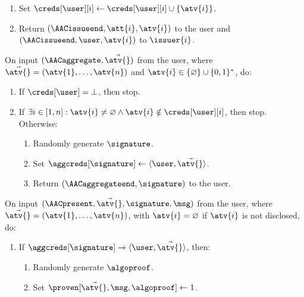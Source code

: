 \begin{framed}
\begin{enumerate}
\begin{enumerate}
	    \end{enumerate}

	  \item Set $\creds[\user][i] \leftarrow \creds[\user][i] \cup
\{\atv{i}\}$.

	  \item Return $(\AACissueend, \att{i}, \atv{i})$ to the user and
$(\AACissueend, \user, \atv{i})$ to $\issuer{i}$.

	\end{enumerate}

	\fuinterface{\AACaggregate} On input $(\AACaggregate, \vec{\atv{}})$ from the
user, where $\vec{\atv{}} = (\atv{1}, \ldots, \atv{n})$ and $\atv{i} \in
\{\varnothing\} \cup \{0, 1\}^*$, do:

	\begin{enumerate}

	  \item If $\creds[\user] = \bot$, then stop.

	  \item If $\exists i \in [1, n]: \atv{i} \neq \varnothing \land \atv{i}
\notin \creds[\user][i]$, then stop. Otherwise:

	    \begin{enumerate}

	      \item Randomly generate $\signature$.

	      \item Set $\aggcreds[\signature] \leftarrow \langle \user,
\vec{\atv{}}\rangle$.

	      \item Return $(\AACaggregateend, \signature)$ to the user.

	    \end{enumerate}

	\end{enumerate}

	\fuinterface{\AACpresent} On input $(\AACpresent, \vec{\atv{}}, \signature,
\msg)$ from the user, where $\vec{\atv{}} = (\atv{1}, \ldots, \atv{n})$, with
$\atv{i} = \varnothing$ if $\atv{i}$ is not disclosed, do:

	\begin{enumerate}

	  \item If $\aggcreds[\signature] \rightarrow \langle \user,
\vec{\atv{}}\rangle$, then:

	    \begin{enumerate}

	      \item Randomly generate $\algoproof$.  \item Set
$\proven[\vec{\atv{}}, \msg, \algoproof] \leftarrow 1$.


\end{enumerate}
\end{enumerate}
\end{framed}
